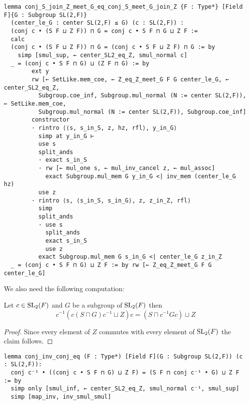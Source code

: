 \begin{footnotesize}
\begin{verbatim}
lemma conj_S_join_Z_meet_G_eq_conj_S_meet_G_join_Z {F : Type*} [Field F]{G : Subgroup SL(2,F)}
  (center_le_G : center SL(2,F) ≤ G) (c : SL(2,F)) :
  (conj c • (S F ⊔ Z F)) ⊓ G = conj c • S F ⊓ G ⊔ Z F :=
  calc
  (conj c • (S F ⊔ Z F)) ⊓ G = (conj c • S F ⊔ Z F) ⊓ G := by
    simp [smul_sup, ← center_SL2_eq_Z, smul_normal c]
  _ = (conj c • S F ⊓ G) ⊔ (Z F ⊓ G) := by
        ext y
        rw [← SetLike.mem_coe, ← Z_eq_Z_meet_G F G center_le_G, ← center_SL2_eq_Z,
          Subgroup.coe_inf, Subgroup.mul_normal (N := center SL(2,F)), ← SetLike.mem_coe,
          Subgroup.mul_normal (N := center SL(2,F)), Subgroup.coe_inf]
        constructor
        · rintro ⟨⟨s, s_in_S, z, hz, rfl⟩, y_in_G⟩
          simp at y_in_G ⊢
          use s
          split_ands
          · exact s_in_S
          · rw [← mul_one s, ← mul_inv_cancel z, ← mul_assoc]
            exact Subgroup.mul_mem G y_in_G <| inv_mem (center_le_G hz)
          use z
        · rintro ⟨s, ⟨s_in_S, s_in_G⟩, z, z_in_Z, rfl⟩
          simp
          split_ands
          · use s
            split_ands
            exact s_in_S
            use z
          exact Subgroup.mul_mem G s_in_G <| center_le_G z_in_Z
  _ = (conj c • S F ⊓ G) ⊔ Z F := by rw [← Z_eq_Z_meet_G F G center_le_G]
\end{verbatim}
\end{footnotesize}


We also need the following computation:

\begin{lemma}
\label{MaximalAbelianSubgroup.conj_inv_conj_eq}
\leanok
Let $c \in \operatorname{SL}_2(F)$ and $G$ be a subgroup of $\operatorname{SL}_2(F)$ then 
\[
c^{-1}(c(S \sqcap G)c^{-1} \sqcup Z)c = (S \sqcap c^{-1}Gc) \sqcup Z
\]
\end{lemma}
\begin{proof}
  \leanok
  Since every element of $Z$ commutes with every element of $\operatorname{SL}_2(F)$ the claim follows.
\end{proof}
\begin{footnotesize}
\begin{verbatim}
lemma conj_inv_conj_eq (F : Type*) [Field F](G : Subgroup SL(2,F)) (c : SL(2,F)):
  conj c⁻¹ • ((conj c • S F ⊓ G) ⊔ Z F) = (S F ⊓ conj c⁻¹ • G) ⊔ Z F := by
  simp only [smul_inf, ← center_SL2_eq_Z, smul_normal c⁻¹, smul_sup]
  simp [map_inv, inv_smul_smul]
\end{verbatim}
\end{footnotesize}

